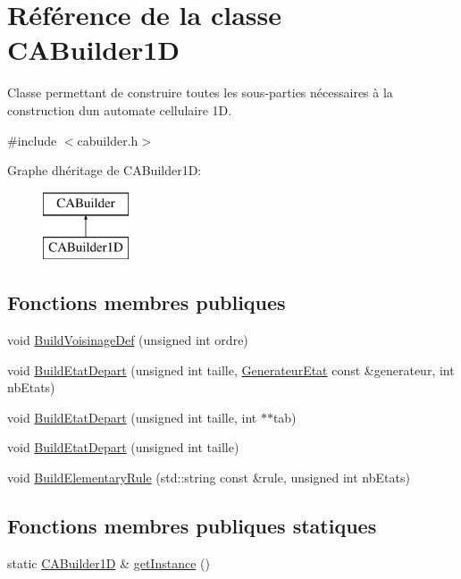 \hypertarget{class_c_a_builder1_d}{}\section{Référence de la classe C\+A\+Builder1D}
\label{class_c_a_builder1_d}


Classe permettant de construire toutes les sous-\/parties nécessaires à la construction d\textquotesingle{}un automate cellulaire 1D.  




{\ttfamily \#include $<$cabuilder.\+h$>$}

Graphe d\textquotesingle{}héritage de C\+A\+Builder1D\+:\begin{figure}[H]
\begin{center}
\leavevmode
\includegraphics[height=2.000000cm]{class_c_a_builder1_d}
\end{center}
\end{figure}
\subsection*{Fonctions membres publiques}
\begin{DoxyCompactItemize}
\item 
void \mbox{\hyperlink{class_c_a_builder1_d_aa82356e955ae82df3eec34cbb8b47758}{Build\+Voisinage\+Def}} (unsigned int ordre)
\item 
void \mbox{\hyperlink{class_c_a_builder1_d_a8fc01c130a00013416532d7e7b43957a}{Build\+Etat\+Depart}} (unsigned int taille, \mbox{\hyperlink{class_generateur_etat}{Generateur\+Etat}} const \&generateur, int nb\+Etats)
\item 
void \mbox{\hyperlink{class_c_a_builder1_d_a0a274571cddf774bd67fc786dcf1684c}{Build\+Etat\+Depart}} (unsigned int taille, int $\ast$$\ast$tab)
\item 
void \mbox{\hyperlink{class_c_a_builder1_d_a77fa7941654a3c41d68df447b1fd7e5f}{Build\+Etat\+Depart}} (unsigned int taille)
\item 
void \mbox{\hyperlink{class_c_a_builder1_d_a992326d218c98a824f006e6cb03ce011}{Build\+Elementary\+Rule}} (std\+::string const \&rule, unsigned int nb\+Etats)
\end{DoxyCompactItemize}
\subsection*{Fonctions membres publiques statiques}
\begin{DoxyCompactItemize}
\item 
static \mbox{\hyperlink{class_c_a_builder1_d}{C\+A\+Builder1D}} \& \mbox{\hyperlink{class_c_a_builder1_d_a92c5780ec0e58f2d56ee28971a50b134}{get\+Instance}} ()
\end{DoxyCompactItemize}
